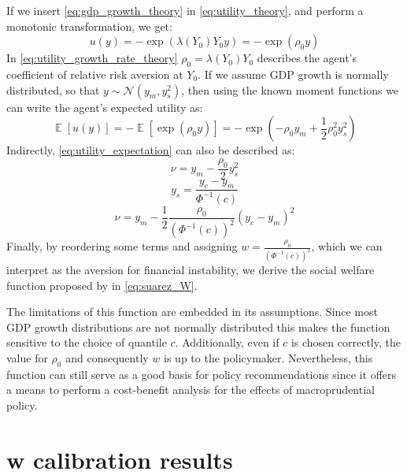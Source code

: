 \documentclass[12pt,a4paper]{article}
\begin{document}
If we insert \autoref{eq:gdp_growth_theory} in \autoref{eq:utility_theory}, and perform a monotonic transformation, we get:
\begin{equation}
    \label{eq:utility_growth_rate_theory}
    u(y) = -\exp{\left(\lambda(Y_0)Y_0y\right)} = -\exp{\left(\rho_0 y\right)}
\end{equation}
In \autoref{eq:utility_growth_rate_theory} $\rho_0=\lambda(Y_0)Y_0$ describes the agent's coefficient of relative risk aversion at $Y_0$. If we assume GDP growth is normally distributed, so that $y\sim\mathcal{N}(y_m,y_s^2)$, then using the known moment functions we can write the agent's expected utility as:
\begin{equation}
    \label{eq:utility_expectation}
    \mathop{\mathbb{E}}\left[u(y)\right] =  -\mathop{\mathbb{E}}\left[\exp{\left(\rho_0 y\right)}\right] = -\exp{\left(-\rho_0 y_m + \frac{1}{2}\rho_0^2 y_s^2 \right)}
\end{equation}
Indirectly, \autoref{eq:utility_expectation} can also be described as: 
\begin{equation}
    \nu = y_m - \frac{\rho_0}{2}y_s^2 
\end{equation}
\begin{equation}
    y_s = \frac{y_c-y_m}{\Phi^{-1}(c)}
\end{equation}
\begin{equation}
    \nu = y_m - \frac{1}{2}\frac{\rho_0}{\left(\Phi^{-1}(c)\right)^2} (y_c - y_m)^2 
\end{equation}
Finally, by reordering some terms and assigning $w=\frac{\rho_0}{\left(\Phi^{-1}(c)\right)^2}$, which we can interpret as the aversion for financial instability, we derive the social welfare function proposed by \citet{suarez2022} in \autoref{eq:suarez_W}.

The limitations of this function are embedded in its assumptions. Since most GDP growth distributions are not normally distributed this makes the function sensitive to the choice of quantile $c$. Additionally, even if $c$ is chosen correctly, the value for $\rho_0$ and consequently $w$ is up to the policymaker. Nevertheless, this function can still serve as a good basis for policy recommendations since it offers a means to perform a cost-benefit analysis for the effects of macroprudential policy.

\section{w calibration results}
\end{document}
